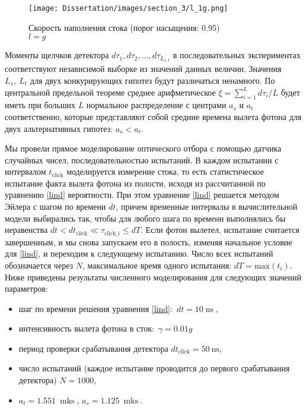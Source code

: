 \begin{figure}[ht!]
	\noindent\centering\texttt{[image: Dissertation/images/section\_3/l\_1g.png]}
	\captionsetup{format=hang,width=0.85\textwidth,justification=centering,singlelinecheck=no}
	\caption{
		Скорость наполнения стока (порог насыщения: 0.95)\\
		$l=g$
	}
	\label{fig:dP1}
\end{figure}

Моменты щелчков детектора $d\tau_1,d\tau_2,\dots,d\tau_{L_{s,t}}$ в последовательных экспериментах соответствуют независимой выборке из значений данных величин. Значения $L_s,~L_t$ для двух конкурирующих гипотез будут различаться ненамного. По центральной предельной теореме среднее арифметическое $\xi=\sum\limits_{i=1}^Ld\tau_{i}/L$ будет иметь при больших $L$ нормальное распределение с центрами $a_s$ и $a_t$ соответственно, которые представляют собой средние времена вылета фотона для двух альтернативных гипотез: $a_{s}<a_{t}$. 

Мы провели прямое моделирование оптического отбора с помощью датчика случайных чисел, последовательностью испытаний. 
В каждом испытании с интервалом $t_{\mathop{\text{click}}}$ моделируется измерение стока, то есть статистическое испытание факта вылета фотона из полости, исходя из рассчитанной по уравнению \eqref{lind} вероятности. При этом уравнение \eqref{lind} решается методом Эйлера с шагом по времени $dt$, причем временные интервалы в вычислительной модели выбирались так, чтобы для любого шага по времени выполнялись бы неравенства $dt<dt_{\mathop{\text{click}}}\ll \tau_{\text{click}\_i}\leq dT$. Если фотон вылетел, испытание считается завершенным, и мы снова запускаем его в полость, изменяя начальное условие для \eqref{lind}, и переходим к следующему испытанию. Число всех испытаний обозначается через $N$, максимальное время одного испытания: $dT=\text{max}(t_i)$. Ниже приведены результаты численного моделирования для следующих значений параметров: 
\begin{itemize}
	\item{шаг по времени решения уравнения \eqref{lind}:\ $dt = 10 \mathop{\text{ns}}$,}
	\item{интенсивность вылета фотона в сток:\ $\gamma = 0.01g$ }
	\item{период проверки срабатывания детектора $dt_{\mathop{\text{click}}}=50~\text{ns}$, }
	\item{число испытаний (каждое испытание проводится до первого срабатывания детектора) $N = 1000$,}
	\item{$a_t = 1.551\ \mathop{\text{mks}}$, $a_s = 1.125\ \mathop{\text{mks}}$.}
\end{itemize}

